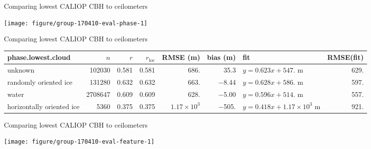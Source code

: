 \documentclass[10pt,notes=all,aspectratio=1610]{beamer}\usepackage[]{graphicx}\usepackage[]{color}
\newenvironment{knitrout}{}{} %
\begin{document}
\begin{frame}[fragile]{Comparing lowest CALIOP CBH to ceilometers}
\begin{knitrout}
\color{fgcolor}

{\centering \texttt{[image: figure/group-170410-eval-phase-1]} 

}



\end{knitrout}
\end{frame}
\begin{frame}[fragile]{Comparing lowest CALIOP CBH to ceilometers}
  \begin{adjustbox}{max width=\textwidth}
\begin{tabular}{lrrrrrlr}
  \hline
\hline
phase.lowest.cloud & $n$ & $r$ & $r_\text{loc}$ & RMSE (m) & bias (m) & fit & RMSE(fit) \\ 
  \hline
unknown & 102030 & 0.581 & 0.581 & 686. & 35.3 & $y = 0.623 x + 547.$ m & 629. \\ 
  randomly oriented ice & 131280 & 0.632 & 0.632 & 663. & $-$8.44 & $y = 0.628 x + 586.$ m & 597. \\ 
  water & 2708647 & 0.609 & 0.609 & 628. & $-$5.00 & $y = 0.596 x + 514.$ m & 557. \\ 
  horizontally oriented ice & 5360 & 0.375 & 0.375 & $1.17 \times 10^{3}$ & $-$505. & $y = 0.418 x + \ensuremath{1.17 \times 10^{3}}$ m & 921. \\ 
   \hline
\hline
\end{tabular}

  \end{adjustbox}
\end{frame}
\begin{frame}[fragile]{Comparing lowest CALIOP CBH to ceilometers}
\begin{knitrout}
\color{fgcolor}

{\centering \texttt{[image: figure/group-170410-eval-feature-1]} 

}



\end{knitrout}
\end{frame}
\end{document}
